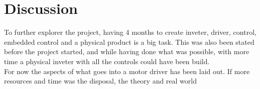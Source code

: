 \section{Discussion}
To further explorer the project, having 4 months to create inveter, driver, control, embedded control and a physical product is a big task. This was also been stated before the project started, and while having done what was possible, with more time a physical inveter with all the controls could have been build. \\

For now the aspects of what goes into a motor driver has been laid out. If more resources and time was the disposal, the theory and real world 